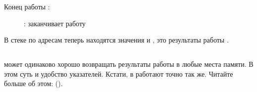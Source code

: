 \clearpage
Конец работы \ttfone:

\begin{figure}[H]
\centering
{}
\caption{\olly: \ttfone заканчивает работу}
\label{fig:pointers_olly_stk_3}
\end{figure}

В стеке по адресам \PtrsAddresses теперь находятся значения  и , это результаты работы \ttfone.

\subsection{\Conclusion{}}

\ttfone может одинаково хорошо возвращать результаты работы в любые места памяти. 
В этом суть и удобство указателей.
Кстати,  в \Cpp работают точно так же. Читайте больше об этом: ().


